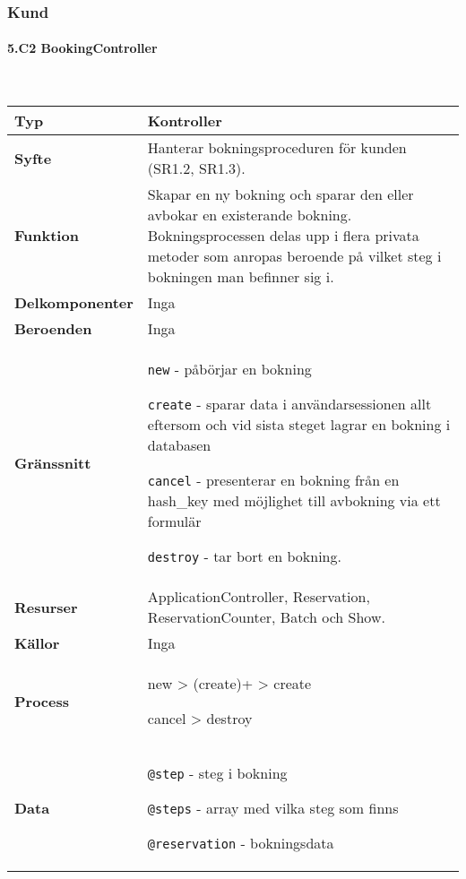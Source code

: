 \documentclass[a4paper, twoside, 11pt, titlepage]{article}
\begin{document}
		\clearpage %
		\subsubsection{Kund}



			\paragraph{5.C2 BookingController}\

			\begin {table} [ht] \begin{tabular} {  p{3.5cm} p{11.6cm} }
				\hline
				{\sffamily\textbf{Typ}} & {Kontroller} \\
				\hline
				{\sffamily\textbf{Syfte}} & {Hanterar bokningsproceduren för kunden (SR1.2, SR1.3).} \\
				\hline
				{\sffamily\textbf{Funktion}} & {Skapar en ny bokning och sparar den eller avbokar en existerande bokning. Bokningsprocessen delas upp i flera privata metoder som anropas beroende på vilket steg i bokningen man befinner sig i.} \\
				\hline
				{\sffamily\textbf{Delkomponenter}} & {Inga} \\
				\hline
				{\sffamily\textbf{Beroenden}} & {Inga} \\
				\hline
				{\sffamily\textbf{Gränssnitt}} & {{\tt new} - påbörjar en bokning

{\tt create} - sparar data i användarsessionen allt eftersom och vid sista steget lagrar en bokning i databasen

{\tt cancel} - presenterar en bokning från en hash\_key med möjlighet till avbokning via ett formulär

{\tt destroy} - tar bort en bokning.} \\
				\hline
				{\sffamily\textbf{Resurser}} & {ApplicationController, Reservation, ReservationCounter, Batch och Show.} \\
				\hline
				{\sffamily\textbf{Källor}} & {Inga} \\
				\hline
				{\sffamily\textbf{Process}} & {new > (create)+ > create

cancel > destroy} \\
				\hline
				{\sffamily\textbf{Data}} & {{\tt @step} - steg i bokning

{\tt @steps} - array med vilka steg som finns

{\tt @reservation} - bokningsdata} \\
				\hline
			\end{tabular} \end{table} \FloatBarrier
\end{document}
